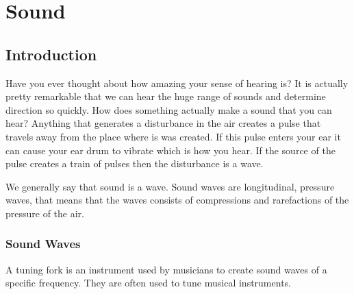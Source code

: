          \chapter{Sound}

    \setcounter{figure}{1}
    \setcounter{subfigure}{1}
    \label{9b5d72dd5f0585e544578ab90a9956a8}
         \section{Introduction}
    \nopagebreak
    \label{m38799*cid2}
\label{m38799*id183123}Have you ever thought about how amazing your sense of hearing is? It is actually pretty remarkable that we can hear the huge range of sounds and determine direction so quickly. How does something actually make a sound that you can hear? Anything that generates a disturbance in the air creates a pulse that travels away from the place where is was created. If this pulse enters your ear it can cause your ear drum to vibrate which is how you hear. If the source of the pulse creates a train of pulses then the disturbance is a wave.
           
We generally say that sound is a wave. Sound waves are longitudinal, pressure waves, that means that the waves consists of compressions and rarefactions of the pressure of the air.\par 

\subsection*{Sound Waves}
            \nopagebreak
A tuning fork is an instrument used by musicians to create sound waves of a specific frequency. They are often used to tune musical instruments.

